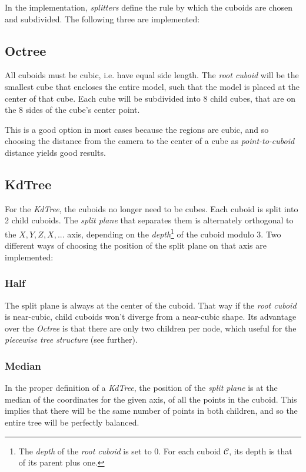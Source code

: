 \documentclass[a4paper,10pt,abstracton,notitlepage]{scrreprt}
\begin{document}
In the implementation, \emph{splitters} define the rule by which the cuboids are chosen and subdivided. The following three are implemented:

\subsection{Octree}
All cuboids must be cubic, i.e. have equal side length. The \emph{root cuboid} will be the smallest cube that encloses the entire model, such that the model is placed at the center of that cube. Each cube will be subdivided into 8 child cubes, that are on the 8 sides of the cube's center point.

This is a good option in most cases because the regions are cubic, and so choosing the distance from the camera to the center of a cube as \emph{point-to-cuboid} distance yields good results.

\subsection{KdTree}
For the \emph{KdTree}, the cuboids no longer need to be cubes. Each cuboid is split into 2 child cuboids. The \emph{split plane} that separates them is alternately orthogonal to the $X, Y, Z, X, ...$ axis, depending on the \emph{depth}\footnote{The \emph{depth} of the \emph{root cuboid} is set to 0. For each cuboid $\mathcal{C}$, its depth is that of its parent plus one.} of the cuboid modulo 3. Two different ways of choosing the position of the split plane on that axis are implemented:

\subsubsection{Half}
The split plane is always at the center of the cuboid. That way if the \emph{root cuboid} is near-cubic, child cuboids won't diverge from a near-cubic shape. Its advantage over the \emph{Octree} is that there are only two children per node, which useful for the \emph{piecewise tree structure} (see further).

\subsubsection{Median}
In the proper definition of a \emph{KdTree}, the position of the \emph{split plane} is at the median of the coordinates for the given axis, of all the points in the cuboid. This implies that there will be the same number of points in both children, and so the entire tree will be perfectly balanced.
\end{document}
